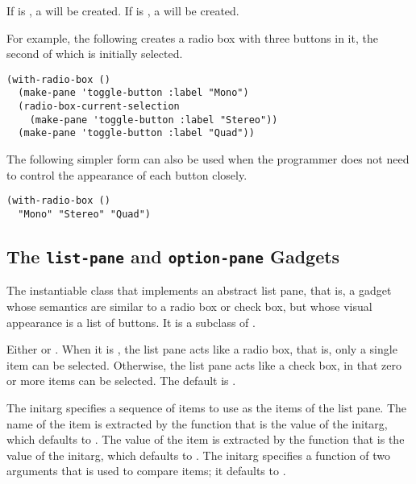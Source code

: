 If  is , a  will be created.  If 
is , a  will be created.

For example, the following creates a radio box with three buttons in it, the
second of which is initially selected.

\begin{verbatim}
(with-radio-box ()
  (make-pane 'toggle-button :label "Mono")
  (radio-box-current-selection
    (make-pane 'toggle-button :label "Stereo"))
  (make-pane 'toggle-button :label "Quad"))
\end{verbatim}

The following simpler form can also be used when the programmer does not need to
control the appearance of each button closely.

\begin{verbatim}
(with-radio-box ()
  "Mono" "Stereo" "Quad")
\end{verbatim}


\subsection {The {\tt list-pane} and {\tt option-pane} Gadgets}


The instantiable class that implements an abstract list pane, that is, a gadget
whose semantics are similar to a radio box or check box, but whose visual
appearance is a list of buttons.  It is a subclass of .


Either  or .  When it is , the
list pane acts like a radio box, that is, only a single item can be selected.
Otherwise, the list pane acts like a check box, in that zero or more items can
be selected. The default is .


The  initarg specifies a sequence of items to use as the items of the
list pane.  The name of the item is extracted by the function that is the value
of the  initarg, which defaults to .  The
value of the item is extracted by the function that is the value of the
 initarg, which defaults to .  The 
initarg specifies a function of two arguments that is used to compare items; it
defaults to .

